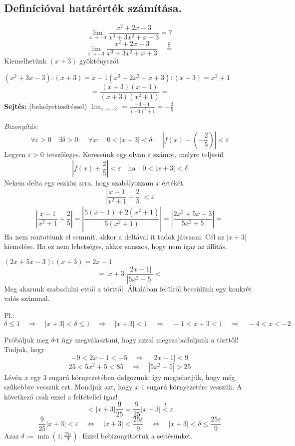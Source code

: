 \documentclass[a4paper,11.5pt]{article}
\begin{document}
	\subsection{Definícióval határérték számítása.}
	\begin{task}
		\[ \lim_{x\to-3}\frac{x^2+2x-3}{x^3+3x^2+x+3}=? \]
		\[ \lim_{x\to-3}\frac{x^2+2x-3}{x^3+3x^2+x+3}\quad \overset{\frac{0}{0}}{=}\]
		Kiemelhetünk $(x+3)$ gyöktényezőt.
		
		$(x^2+3x-3):(x+3)=x-1$\quad \quad \quad $(x^3+2x^2+x+3):(x+3)=x^2+1$
		\[ =\frac{(x+3)(x-1)}{(x+3)(x^2+1)}= \]
		\textbf{Sejtés:} (behelyettesítéssel) $\displaystyle \lim_{x\to-3}=\frac{-3-1}{(-3)^2+1}=-\frac{2}{5}$
		
		\medskip
		\textit{Bizonyítás:}
		\[ \forall\varepsilon>0\quad \exists\delta>0:\quad \forall x:\quad 0<|x+3|<\delta:\quad \left|f(x)-\left(-\frac{2}{5}\right)\right|<\varepsilon \]
		Legyen $\varepsilon>0$ tetszőleges. Keressünk egy olyan $\varepsilon$ számot, melyre teljesül 
		\[ \left|f(x)+\frac{2}{5}\right|<\varepsilon\quad \text{ha}\quad 0<|x+3|<\delta \]
		Nekem delta egy eszköz arra, hogy szabályozzam $x$ értékét.
		\[ \left|\frac{x-1}{x^2+1}+\frac{2}{5}\right|<\varepsilon \]
		\[ \left|\frac{x-1}{x^2+1}+\frac{2}{5}\right|=\left|\frac{5(x-1)+2(x^2+1)}{5(x^2+1)}\right|=\left|\frac{2x^2+5x-3}{5x^2+5}\right|= \]
		Ha nem rontottunk el semmit, akkor a deltával it tudok játszani. Cél az $|x+3|$ kiemelése. Ha ez nem lehetséges, akkor sanszos, hogy nem igaz az állítás. 
		
		$(2x+5x-3):(x+3)=2x-1$
		\[ =\left|x+3\right|\frac{|2x-1|}{|5x^2+5|}< \]
		Meg akarunk szabadulni ettől a törttől. Általában felülről becsülünk egy konkrét valós számmal. 
		
		Pl.:\quad $\delta\leq1\quad \Rightarrow\quad |x+3|<\delta\leq1\quad \Rightarrow\quad |x+3|<1\quad \Rightarrow\quad -1<x+3<1\quad \Rightarrow\quad -4<x<-2$
		
		Próbáljuk meg $\delta$-t úgy megválasztani, hogy azzal megszabaduljunk a törttől! Tudjuk, hogy 
		\[-9<2x-1<-5\quad \Rightarrow\quad|2x-1|<9\]
		\[ 25<5x^2+5<85\quad \Rightarrow\quad |5x^2+5|>25 \]
		Lévén $x$ egy 3 sugarú környezetében dolgozunk, így megtehetjük, hogy még szűkebbre vesszük ezt. Mondjuk azt, hogy $ x$ 1 sugarú környezetére vesszük. A következő csak ezzel a feltétellel igaz!
		\[ <|x+3|\frac{9}{25}=\frac{9}{25}|x+3|\overset{!}{<}\varepsilon \]
		\[ \frac{9}{25}|x+3|<\varepsilon\quad \Leftrightarrow\quad |x+3|<\frac{25\varepsilon}{9}\quad \Leftrightarrow\quad |x+3|<\delta\leq\frac{25\varepsilon}{9} \]
		Azaz $\delta:=\min\left(1;\frac{25\varepsilon}{9}\right)$. Ezzel bebizonyítottuk a sejtésünket.
	\end{task}
\end{document}
